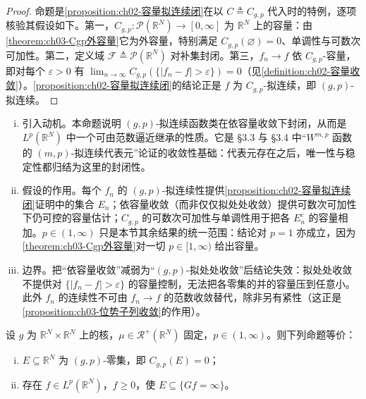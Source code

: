 \documentclass[../../main.tex]{subfiles}%
\begin{document}
\begin{proof}
命题是\cref{proposition:ch02-容量拟连续闭}在以 $C\triangleq C_{g,p}$ 代入时的特例，逐项核验其假设如下。第一，$C_{g,p}:\mathcal{P}(\mathbb{R}^N)\to[0,\infty]$ 为 $\mathbb{R}^N$ 上的容量：由\cref{theorem:ch03-Cgp外容量}它为外容量，特别满足 $C_{g,p}(\varnothing)=0$、单调性与可数次可加性。第二，定义域 $\mathscr{F}\triangleq\mathcal{P}(\mathbb{R}^N)$ 对补集封闭。第三，$f_n\to f$ 依 $C_{g,p}$-容量，即对每个 $\varepsilon>0$ 有 $\lim_{n\to\infty}C_{g,p}(\{|f_n-f|>\varepsilon\})=0$（见\cref{definition:ch02-容量收敛}）。\cref{proposition:ch02-容量拟连续闭}的结论正是 $f$ 为 $C_{g,p}$-拟连续，即 $(g,p)$-拟连续。
\end{proof}

\begin{remark}\label{remark:ch03-拟连续稳定}
\begin{enumerate}[(i)]
\item 引入动机。本命题说明 $(g,p)$-拟连续函数类在依容量收敛下封闭，从而是 $L^p(\mathbb{R}^N)$ 中一个可由范数逼近继承的性质。它是 \S3.3 与 \S3.4 中“$W^{m,p}$ 函数的 $(m,p)$-拟连续代表元”论证的收敛性基础：代表元存在之后，唯一性与稳定性都归结为这里的封闭性。

\item 假设的作用。每个 $f_n$ 的 $(g,p)$-拟连续性提供\cref{proposition:ch02-容量拟连续闭}证明中的集合 $E_n$；依容量收敛（而非仅仅拟处处收敛）提供可数次可加性下仍可控的容量估计；$C_{g,p}$ 的可数次可加性与单调性用于把各 $E_n^c$ 的容量相加。$p\in(1,\infty)$ 只是本节其余结果的统一范围：结论对 $p=1$ 亦成立，因为\cref{theorem:ch03-Cgp外容量}对一切 $p\in[1,\infty)$ 给出容量。

\item 边界。把“依容量收敛”减弱为“$(g,p)$-拟处处收敛”后结论失效：拟处处收敛不提供对 $\{|f_n-f|>\varepsilon\}$ 的容量控制，无法把各零集的并的容量压到任意小。此外 $f_n$ 的连续性不可由 $f_n\to f$ 的范数收敛替代，除非另有紧性（这正是\cref{proposition:ch03-位势子列收敛}的作用）。
\end{enumerate}
\end{remark}

\begin{lemma}\label{lemma:ch03-零集刻画}
设 $g$ 为 $\mathbb{R}^N\times\mathbb{R}^N$ 上的核，$\mu\in\mathscr{R}^+(\mathbb{R}^N)$ 固定，$p\in(1,\infty)$。则下列命题等价：
\begin{enumerate}[(i)]
\item $E\subseteq\mathbb{R}^N$ 为 $(g,p)$-零集，即 $C_{g,p}(E)=0$；
\item 存在 $f\in L^p(\mathbb{R}^N)$，$f\geqslant0$，使 $E\subseteq\{Gf=\infty\}$。
\end{enumerate}
\end{lemma}
\end{document}
